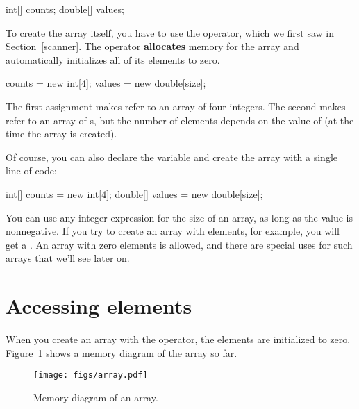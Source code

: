 \begin{code}
int[] counts;
double[] values;
\end{code}


To create the array itself, you have to use the  operator, which we first saw in Section~\ref{scanner}.
The  operator {\bf allocates} memory for the array and automatically initializes all of its elements to zero.

\begin{code}
counts = new int[4];
values = new double[size];
\end{code}

The first assignment makes  refer to an array of four integers.
The second makes  refer to an array of s, but the number of elements depends on the value of  (at the time the array is created).

Of course, you can also declare the variable and create the array with a single line of code:

\begin{code}
int[] counts = new int[4];
double[] values = new double[size];
\end{code}


You can use any integer expression for the size of an array, as long as the value is nonnegative.
If you try to create an array with  elements, for example, you will get a .
An array with zero elements is allowed, and there are special uses for such arrays that we'll see later on.


\section{Accessing elements}
\label{elements}

When you create an array with the  operator, the elements are initialized to zero.
Figure~\ref{fig.array} shows a memory diagram of the  array so far.

\begin{figure}[!ht]
\begin{center}
\texttt{[image: figs/array.pdf]}
\caption{Memory diagram of an  array.}
\label{fig.array}
\end{center}
\end{figure}


